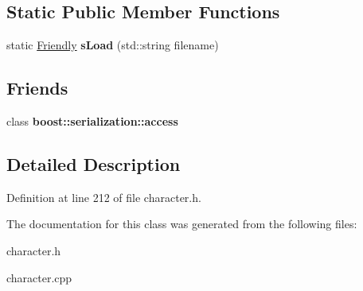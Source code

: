 \subsection*{Static Public Member Functions}
\begin{DoxyCompactItemize}
\item 
\hypertarget{class_friendly_aed039045cd15d26708634105abbea232}{}\label{class_friendly_aed039045cd15d26708634105abbea232} 
static \hyperlink{class_friendly}{Friendly} {\bfseries s\+Load} (std\+::string filename)
\end{DoxyCompactItemize}
\subsection*{Friends}
\begin{DoxyCompactItemize}
\item 
\hypertarget{class_friendly_ac98d07dd8f7b70e16ccb9a01abf56b9c}{}\label{class_friendly_ac98d07dd8f7b70e16ccb9a01abf56b9c} 
class {\bfseries boost\+::serialization\+::access}
\end{DoxyCompactItemize}


\subsection{Detailed Description}


Definition at line 212 of file character.\+h.



The documentation for this class was generated from the following files\+:\begin{DoxyCompactItemize}
\item 
character.\+h\item 
character.\+cpp\end{DoxyCompactItemize}
